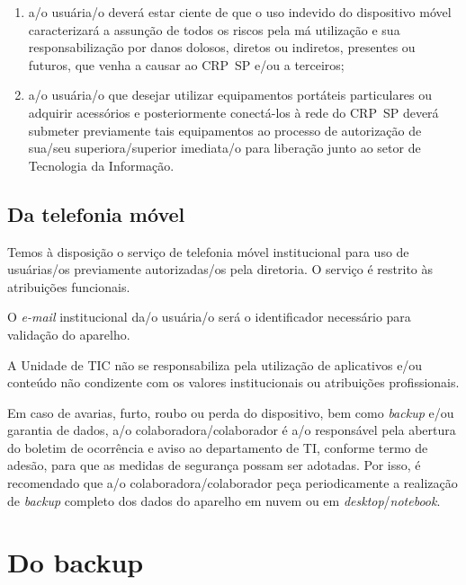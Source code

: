 \documentclass[openright, twoside, a4paper]{memoir}
\begin{document}
\begin{enumerate}
    gestora/gestor direta/o e o departamento de Tecnologia da Informação
    do furto ou roubo de um dispositivo móvel fornecido pelo CRP~SP. Além
    disso, deverá procurar a ajuda das autoridades policiais, registrando
    um boletim de ocorrência;
\item
    a/o usuária/o deverá estar ciente de que o uso indevido do dispositivo
    móvel caracterizará a assunção de todos os riscos pela má utilização e
    sua responsabilização por danos dolosos, diretos ou indiretos,
    presentes ou futuros, que venha a causar ao CRP~SP e/ou a terceiros;
\item
    a/o usuária/o que desejar utilizar equipamentos portáteis particulares
    ou adquirir acessórios e posteriormente conectá-los à rede do CRP~SP
    deverá submeter previamente tais equipamentos ao processo de
    autorização de sua/seu superiora/superior imediata/o para liberação
    junto ao setor de Tecnologia da Informação.
\end{enumerate}

\section{Da telefonia móvel}

Temos à disposição o serviço de telefonia móvel institucional para uso
de usuárias/os previamente autorizadas/os pela diretoria. O serviço é
restrito às atribuições funcionais.

O \emph{e-mail} institucional da/o usuária/o será o identificador
necessário para validação do aparelho.

A Unidade de TIC não se responsabiliza pela utilização de aplicativos
e/ou conteúdo não condizente com os valores institucionais ou
atribuições profissionais.

Em caso de avarias, furto, roubo ou perda do dispositivo, bem como
\emph{backup} e/ou garantia de dados, a/o colaboradora/colaborador é a/o
responsável pela abertura do boletim de ocorrência e aviso ao
departamento de TI, conforme termo de adesão, para que as medidas de
segurança possam ser adotadas. Por isso, é recomendado que a/o
colaboradora/colaborador peça periodicamente a realização de
\emph{backup} completo dos dados do aparelho em nuvem ou em
\emph{desktop}/\emph{notebook}.

\clearpage\chapter{Do backup}
\end{document}

